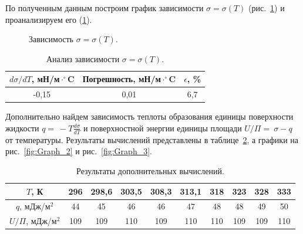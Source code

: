 \documentclass[a4paper,12pt]{article} %
\begin{document}
	По полученным данным построим график зависимости $\sigma = \sigma (T)$ (рис.~\ref{ris:Graph_1}) и проанализируем его (\ref{table:Graph_1}).
	\begin{figure}[H]
		\caption{Зависимость $\sigma = \sigma (T)$.}
		\label{ris:Graph_1}
	\end{figure}


\begin{table}[H]
	\caption{Анализ зависимости $\sigma = \sigma (T)$.}
	\label{table:Graph_1}
\begin{tabular}{|c|c|c|}
	\hline
	$d\sigma / d T$, мН/м$\cdot^\circ$C & Погрешность, мН/м$\cdot^\circ$C & $\epsilon$, \% \\ \hline
	-0,15                               & 0,01                            & 6,7            \\ \hline
\end{tabular}
\end{table}


	Дополнительно найдем зависимость теплоты образования единицы поверхности жидкости $q =~-T\frac{d\sigma}{dT}$ и поверхностной энергии единицы площади $U/\Pi =~\sigma - q$ от температуры. Результаты вычислений представлены в таблице~\ref{table:Graph_2-3}, а графики на рис.~\ref{fig:Graph_2} и рис.~\ref{fig:Graph_3}.
	\begin{table}[H]
		\caption{Результаты дополнительных вычислений.}
		\label{table:Graph_2-3}
\begin{tabular}{|c|c|c|c|c|c|c|c|c|c|}
\hline
$T$, К        & 296 & 298,6 & 303,5 & 308,3 & 313,1 & 318 & 323 & 328 & 333 \\ \hline
$q$, мДж/м$^2$     & 44  & 45    & 46    & 46    & 47    & 48  & 48  & 49  & 50  \\ \hline
$U/\Pi$, мДж/м$^2$ & 109 & 109   & 110   & 109   & 110   & 110 & 109 & 109 & 110 \\ \hline
\end{tabular}
	\end{table}
	
\end{document}
